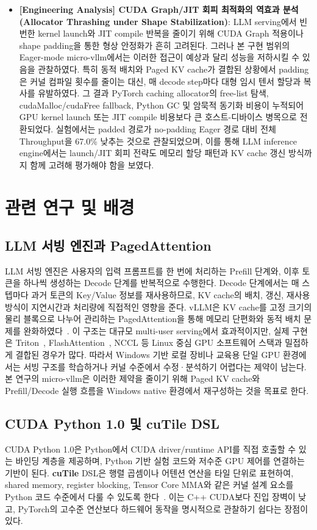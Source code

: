 \documentclass{kcc}            %
\begin{document}
\begin{itemize}
\item \textbf{[Engineering Analysis] CUDA Graph/JIT 회피 최적화의 역효과 분석 (Allocator Thrashing under Shape Stabilization)}: LLM serving에서 빈번한 kernel launch와 JIT compile 반복을 줄이기 위해 CUDA Graph 적용이나 shape padding을 통한 형상 안정화가 흔히 고려된다. 그러나 본 구현 범위의 Eager-mode micro-vllm에서는 이러한 접근이 예상과 달리 성능을 저하시킬 수 있음을 관찰하였다. 특히 동적 배치와 Paged KV cache가 결합된 상황에서 padding은 커널 컴파일 횟수를 줄이는 대신, 매 decode step마다 대형 임시 텐서 할당과 복사를 유발하였다. 그 결과 PyTorch caching allocator의 free-list 탐색, cudaMalloc/cudaFree fallback, Python GC 및 암묵적 동기화 비용이 누적되어 GPU kernel launch 또는 JIT compile 비용보다 큰 호스트-디바이스 병목으로 전환되었다. 실험에서는 padded 경로가 no-padding Eager 경로 대비 전체 Throughput을 67.0\% 낮추는 것으로 관찰되었으며, 이를 통해 LLM inference engine에서는 launch/JIT 회피 전략도 메모리 할당 패턴과 KV cache 갱신 방식까지 함께 고려해 평가해야 함을 보였다.
\end{itemize}

\section{관련 연구 및 배경}
\subsection{LLM 서빙 엔진과 PagedAttention}
LLM 서빙 엔진은 사용자의 입력 프롬프트를 한 번에 처리하는 Prefill 단계와,
이후 토큰을 하나씩 생성하는 Decode 단계를 반복적으로 수행한다. Decode
단계에서는 매 스텝마다 과거 토큰의 Key/Value 정보를 재사용하므로, KV
cache의 배치, 갱신, 재사용 방식이 지연시간과 처리량에 직접적인 영향을
준다. vLLM은 KV cache를 고정 크기의 물리 블록으로 나누어 관리하는
PagedAttention을 통해 메모리 단편화와 동적 배치 문제를 완화하였다~\cite{pagedattention}.
이 구조는 대규모 multi-user serving에서 효과적이지만, 실제 구현은
Triton~\cite{triton}, FlashAttention~\cite{flashattention}, NCCL 등 Linux 중심 GPU 소프트웨어 스택과
밀접하게 결합된 경우가 많다. 따라서 Windows 기반 로컬 장비나 교육용 단일
GPU 환경에서는 서빙 구조를 학습하거나 커널 수준에서 수정·분석하기 어렵다는
제약이 남는다. 본 연구의 micro-vllm은 이러한 제약을 줄이기 위해 Paged KV
cache와 Prefill/Decode 실행 흐름을 Windows native 환경에서 재구성하는 것을
목표로 한다.

\subsection{CUDA Python 1.0 및 cuTile DSL}
CUDA Python 1.0은 Python에서 CUDA driver/runtime API를 직접 호출할 수 있는
바인딩 계층을 제공하며, Python 기반 실험 코드와 저수준 GPU 제어를 연결하는
기반이 된다. \textbf{cuTile} DSL은 행렬 곱셈이나 어텐션 연산을 타일 단위로
표현하여, shared memory, register blocking, Tensor Core MMA와 같은 커널
설계 요소를 Python 코드 수준에서 다룰 수 있도록 한다~\cite{nvidia-cuda133,nvidia-cutile}. 이는 C++
CUDA보다 진입 장벽이 낮고, PyTorch의 고수준 연산보다 하드웨어 동작을
명시적으로 관찰하기 쉽다는 장점이 있다.
\end{document}
